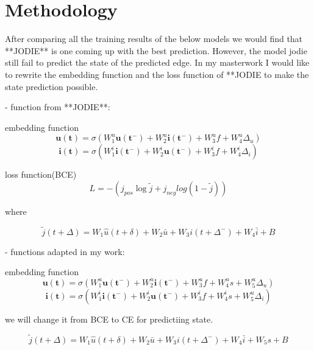 \chapter{Methodology}\label{chapter:methodology}
After comparing all the training results of the below models we would find that **JODIE** is one coming up with the best prediction. However, the model jodie still fail to predict the state of the predicted edge.
In my masterwork I would like to rewrite the embedding function and the loss function of **JODIE to make the state prediction possible.

- function from **JODIE**:

embedding function
$$ \mathbf{u(t)}=\sigma(W_1^u\mathbf{u(t^-)}+W_2^u\mathbf{i(t^-)}+W_3^uf+W^u_4 \Delta _u)$$
$$ \mathbf{i(t)}=\sigma(W_1^i\mathbf{i(t^-)}+W_2^i\mathbf{u(t^-)}+W_3^if+W^i_4 \Delta _i)$$

loss function(BCE)
$$L=-(j_{pos}\log{\tilde{j}}+j_{neg}log(1-\tilde{j}))$$

where

$$\tilde{j}(t+\Delta)=W_1\hat{u}(t+\delta)+W_2\bar{u}+W_3i(t+\Delta ^-)+W_4\bar{i}+B$$



- functions adapted in my work:

embedding function
$$ \mathbf{u(t)}=\sigma(W_1^u\mathbf{u(t^-)}+W_2^u\mathbf{i(t^-)}+W_3^uf+W^u_4s+W^u_5\Delta _u)$$
$$ \mathbf{i(t)}=\sigma(W_1^i\mathbf{i(t^-)}+W_2^i\mathbf{u(t^-)}+W_3^if+W^i_4s+W^u_5 \Delta _i)$$

we will change it from BCE to CE for predictiing state.

$$\tilde{j}(t+\Delta)=W_1\hat{u}(t+\delta)+W_2\bar{u}+W_3i(t+\Delta ^-)+W_4\bar{i}+W_5s+B$$